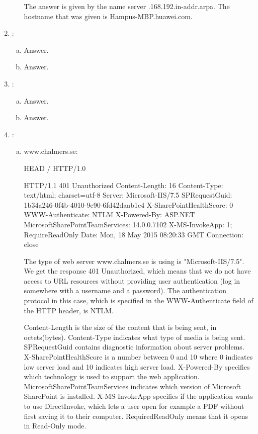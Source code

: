 \documentclass[a4paper,9pt,fleqn]{article}
\begin{document}
\begin{enumerate}[{Task} 1]
\begin{enumerate}[a)]
The answer is given by the name server {.168.192.in-addr.arpa}. The
hostname that was given is {\outp Hampus-MBP.huawei.com}.
\end{enumerate}

\item :
\begin{enumerate}[a)]
\item 
Answer.  
\item 
Answer.
\end{enumerate}

\item :
\begin{enumerate}[a)]
\item 
Answer.  
\item 
Answer.
\end{enumerate}

\item :
\begin{enumerate}[a)]
\item 
www.chalmers.se:

	HEAD / HTTP/1.0

	HTTP/1.1 401 Unauthorized
	Content-Length: 16
	Content-Type: text/html; charset=utf-8
	Server: Microsoft-IIS/7.5
	SPRequestGuid: 1b34a246-0f4b-4010-9e90-6fd42daab1e4
	X-SharePointHealthScore: 0
	WWW-Authenticate: NTLM
	X-Powered-By: ASP.NET
	MicrosoftSharePointTeamServices: 14.0.0.7102
	X-MS-InvokeApp: 1; RequireReadOnly
	Date: Mon, 18 May 2015 08:20:33 GMT
	Connection: close

	The type of web server www.chalmers.se is using is "Microsoft-IIS/7.5".
	We get the response 401 Unauthorized, which means that we do not have access
	to URL resources without providing user authentication (log in somewhere with a username and a password). The authentication protocol in this case, which is specified in the WWW-Authenticate field of the HTTP header, is NTLM.

	Content-Length is the size of the content that is being sent, in octets(bytes).
	Content-Type indicates what type of media is being sent.
	SPRequestGuid contains diagnostic information about server problems.
	X-SharePointHealthScore is a number between 0 and 10 where 0 indicates low server load and 10 indicates high server load.
	X-Powered-By specifies which technology is used to support the web application.
	MicrosoftSharePointTeamServices indicates which version of Microsoft SharePoint is installed.
	X-MS-InvokeApp specifies if the application wants to use DirectInvoke, which lets a user open for example a PDF without first saving it to their computer. RequiredReadOnly means that it opens in Read-Only mode.



\end{enumerate}
\end{enumerate}
\end{document}
